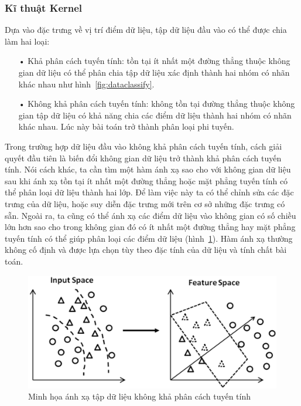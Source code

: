 \subsubsection*{Kĩ thuật Kernel}
Dựa vào đặc trưng về vị trí điểm dữ liệu, tập dữ liệu đầu vào có thể được chia làm hai loại:
\begin{itemize}
\item[•] Khả phân cách tuyến tính: tồn tại ít nhất một đường thẳng thuộc không gian dữ liệu có thể phân chia tập dữ liệu xác định thành hai nhóm có nhãn khác nhau như hình~\ref{fig:dataclassify}.
\item[•] Không khả phân cách tuyến tính: không tồn tại đường thẳng thuộc không gian tập dữ liệu có khả năng chia các điểm dữ liệu thành hai nhóm có nhãn khác nhau. Lúc này bài toán trở thành phân loại phi tuyến.
\end{itemize}
Trong trường hợp dữ liệu đầu vào không khả phân cách tuyến tính, cách giải quyết đầu tiên là biến đổi không gian dữ liệu trở thành khả phân cách tuyến tính. Nói cách khác, ta cần tìm một hàm ánh xạ sao cho với không gian dữ liệu sau khi ánh xạ tồn tại ít nhất một đường thẳng hoặc mặt phẳng tuyến tính có thể phân loại dữ liệu thành hai lớp. Để làm việc này ta có thể chỉnh sửa các đặc trưng của dữ liệu, hoặc suy diễn đặc trưng mới trên cơ sở những đặc trưng có sẵn. Ngoài ra, ta cũng có thể ánh xạ các điểm dữ liệu vào không gian có số chiều lớn hơn sao cho trong không gian đó có ít nhất một đường thẳng hay mặt phẳng tuyến tính có thể giúp phân loại các điểm dữ liệu (hình~\ref{fig:axkernel}). Hàm ánh xạ thường không cố định và được lựa chọn tùy theo đặc tính của dữ liệu và tính chất bài toán.
\begin{figure}[h]
\centering
\includegraphics[scale=0.3]{hinh/kernel.png}
\caption[Caption for LOF]{Minh họa ánh xạ tập dữ liệu không khả phân cách tuyến tính \footnotemark}
\label{fig:axkernel}
\end{figure}
